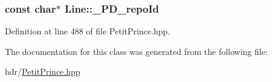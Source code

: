 \subsubsection[{\texorpdfstring{\+\_\+\+P\+D\+\_\+repo\+Id}{_PD_repoId}}]{ const char$\ast$ Line\+::\+\_\+\+P\+D\+\_\+repo\+Id\hspace{0.3cm}{\ttfamily [static]}}\hypertarget{class_line_a38707cdd2f006195ad299c521928dc32}{}\label{class_line_a38707cdd2f006195ad299c521928dc32}


Definition at line 488 of file Petit\+Prince.\+hpp.



The documentation for this class was generated from the following file\+:\begin{DoxyCompactItemize}
\item 
hdr/\hyperlink{_petit_prince_8hpp}{Petit\+Prince.\+hpp}\end{DoxyCompactItemize}
